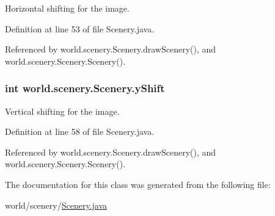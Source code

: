 Horizontal shifting for the image. 



Definition at line 53 of file Scenery.\-java.



Referenced by world.\-scenery.\-Scenery.\-draw\-Scenery(), and world.\-scenery.\-Scenery.\-Scenery().

\hypertarget{a00024_ac9ca2c17cf6920deffe490c013b0e638}{
\subsubsection[{y\-Shift}]{\setlength{\rightskip}{0pt plus 5cm}int world.\-scenery.\-Scenery.\-y\-Shift\hspace{0.3cm}{\ttfamily [protected]}}}\label{a00024_ac9ca2c17cf6920deffe490c013b0e638}


Vertical shifting for the image. 



Definition at line 58 of file Scenery.\-java.



Referenced by world.\-scenery.\-Scenery.\-draw\-Scenery(), and world.\-scenery.\-Scenery.\-Scenery().



The documentation for this class was generated from the following file\-:\begin{DoxyCompactItemize}
\item 
world/scenery/\hyperlink{a00070}{Scenery.\-java}\end{DoxyCompactItemize}
